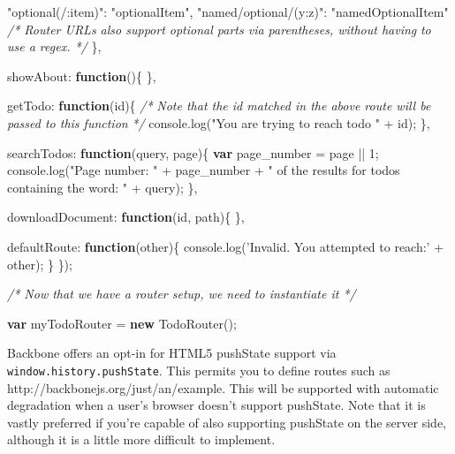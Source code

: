 \documentclass[9pt]{book}
\newenvironment{Shaded}{}{}
\newcommand{\KeywordTok}[1]{\textcolor[rgb]{0.00,0.44,0.13}{\textbf{{#1}}}}
\newcommand{\DataTypeTok}[1]{\textcolor[rgb]{0.56,0.13,0.00}{{#1}}}
\newcommand{\DecValTok}[1]{\textcolor[rgb]{0.25,0.63,0.44}{{#1}}}
\newcommand{\StringTok}[1]{\textcolor[rgb]{0.25,0.44,0.63}{{#1}}}
\newcommand{\CommentTok}[1]{\textcolor[rgb]{0.38,0.63,0.69}{\textit{{#1}}}}
\newcommand{\OtherTok}[1]{\textcolor[rgb]{0.00,0.44,0.13}{{#1}}}
\newcommand{\FunctionTok}[1]{\textcolor[rgb]{0.02,0.16,0.49}{{#1}}}
\newcommand{\NormalTok}[1]{{#1}}
\begin{document}
\begin{Shaded}
\begin{Highlighting}[]
        \StringTok{"optional(/:item)"}\NormalTok{: }\StringTok{"optionalItem"}\NormalTok{,}
        \StringTok{"named/optional/(y:z)"}\NormalTok{: }\StringTok{"namedOptionalItem"}
        \CommentTok{/* Router URLs also support optional parts via parentheses, without having}
\CommentTok{           to use a regex.  */}
    \NormalTok{\},}

    \DataTypeTok{showAbout}\NormalTok{: }\KeywordTok{function}\NormalTok{()\{}
    \NormalTok{\},}

    \DataTypeTok{getTodo}\NormalTok{: }\KeywordTok{function}\NormalTok{(id)\{}
        \CommentTok{/*}
\CommentTok{        Note that the id matched in the above route will be passed to this function}
\CommentTok{        */}
        \OtherTok{console}\NormalTok{.}\FunctionTok{log}\NormalTok{(}\StringTok{"You are trying to reach todo "} \NormalTok{+ id);}
    \NormalTok{\},}

    \DataTypeTok{searchTodos}\NormalTok{: }\KeywordTok{function}\NormalTok{(query, page)\{}
        \KeywordTok{var} \NormalTok{page_number = page || }\DecValTok{1}\NormalTok{;}
        \OtherTok{console}\NormalTok{.}\FunctionTok{log}\NormalTok{(}\StringTok{"Page number: "} \NormalTok{+ page_number + }\StringTok{" of the results for todos containing the word: "} \NormalTok{+ query);}
    \NormalTok{\},}

    \DataTypeTok{downloadDocument}\NormalTok{: }\KeywordTok{function}\NormalTok{(id, path)\{}
    \NormalTok{\},}

    \DataTypeTok{defaultRoute}\NormalTok{: }\KeywordTok{function}\NormalTok{(other)\{}
        \OtherTok{console}\NormalTok{.}\FunctionTok{log}\NormalTok{(}\StringTok{'Invalid. You attempted to reach:'} \NormalTok{+ other);}
    \NormalTok{\}}
\NormalTok{\});}

\CommentTok{/* Now that we have a router setup, we need to instantiate it */}

\KeywordTok{var} \NormalTok{myTodoRouter = }\KeywordTok{new} \FunctionTok{TodoRouter}\NormalTok{();}
\end{Highlighting}
\end{Shaded}

Backbone offers an opt-in for HTML5 pushState support via
\texttt{window.history.pushState}. This permits you to define routes
such as http://backbonejs.org/just/an/example. This will be supported
with automatic degradation when a user's browser doesn't support
pushState. Note that it is vastly preferred if you're capable of also
supporting pushState on the server side, although it is a little more
difficult to implement.
\end{document}
